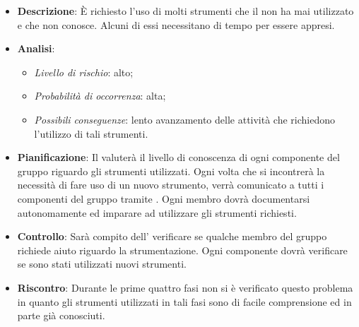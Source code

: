 			\begin{itemize}
				\item \textbf{Descrizione}: È richiesto l'uso di molti strumenti  che il  non ha mai utilizzato e che non conosce. Alcuni di essi necessitano di tempo per essere appresi.
				\item \textbf{Analisi}:
				\begin{itemize}
					\item \textit{Livello di rischio}: alto;
					\item \textit{Probabilità di occorrenza}: alta;
					\item \textit{Possibili conseguenze}: lento avanzamento delle attività che richiedono l'utilizzo di tali strumenti.
				\end{itemize}
				\item \textbf{Pianificazione}: Il  valuterà il livello di conoscenza di ogni componente del gruppo riguardo gli strumenti utilizzati. Ogni volta che si incontrerà la necessità di fare uso di un nuovo strumento, verrà comunicato a tutti i componenti del gruppo tramite . Ogni membro dovrà documentarsi autonomamente ed imparare ad utilizzare gli strumenti richiesti.
				\item \textbf{Controllo}: Sarà compito dell' verificare se qualche membro del gruppo richiede aiuto riguardo la strumentazione. Ogni componente dovrà verificare se sono stati utilizzati nuovi strumenti.
				\item \textbf{Riscontro}: Durante le prime quattro fasi non si è verificato questo problema in quanto gli strumenti utilizzati in tali fasi sono di facile comprensione ed in parte già conosciuti.
			\end{itemize}
